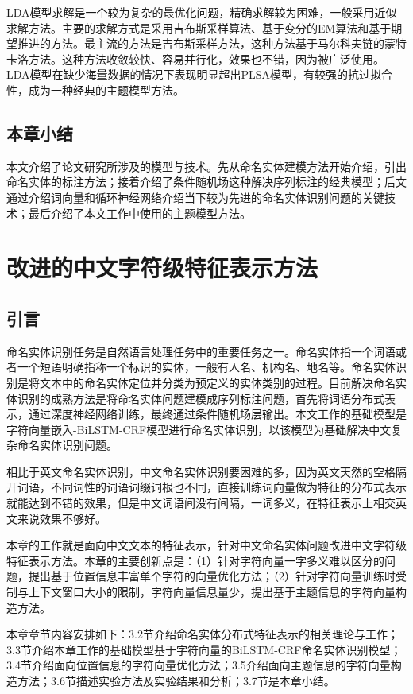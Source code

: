 \documentclass[winfonts,master,oneside,nobackinfo]{njuthesis}
\begin{document}
LDA模型求解是一个较为复杂的最优化问题，精确求解较为困难，一般采用近似求解方法。主要的求解方式是采用吉布斯采样算法、基于变分的EM算法和基于期望推进的方法。最主流的方法是吉布斯采样方法，这种方法基于马尔科夫链的蒙特卡洛方法。这种方法收敛较快、容易并行化，效果也不错，因为被广泛使用。LDA模型在缺少海量数据的情况下表现明显超出PLSA模型，有较强的抗过拟合性，成为一种经典的主题模型方法。

\section{本章小结}

本文介绍了论文研究所涉及的模型与技术。先从命名实体建模方法开始介绍，引出命名实体的标注方法；接着介绍了条件随机场这种解决序列标注的经典模型；后文通过介绍词向量和循环神经网络介绍当下较为先进的命名实体识别问题的关键技术；最后介绍了本文工作中使用的主题模型方法。


\chapter{改进的中文字符级特征表示方法}

\section{引言}

命名实体识别任务是自然语言处理任务中的重要任务之一。命名实体指一个词语或者一个短语明确指称一个标识的实体，一般有人名、机构名、地名等。命名实体识别是将文本中的命名实体定位并分类为预定义的实体类别的过程。目前解决命名实体识别的成熟方法是将命名实体问题建模成序列标注问题，首先将词语分布式表示，通过深度神经网络训练，最终通过条件随机场层输出。本文工作的基础模型是字符向量嵌入-BiLSTM-CRF模型进行命名实体识别，以该模型为基础解决中文复杂命名实体识别问题。

相比于英文命名实体识别，中文命名实体识别要困难的多，因为英文天然的空格隔开词语，不同词性的词语词缀词根也不同，直接训练词向量做为特征的分布式表示就能达到不错的效果，但是中文词语间没有间隔，一词多义，在特征表示上相交英文来说效果不够好。

本章的工作就是面向中文文本的特征表示，针对中文命名实体问题改进中文字符级特征表示方法。本章的主要创新点是：（1）针对字符向量一字多义难以区分的问题，提出基于位置信息丰富单个字符的向量优化方法；（2）针对字符向量训练时受制与上下文窗口大小的限制，字符向量信息量少，提出基于主题信息的字符向量构造方法。

本章章节内容安排如下：3.2节介绍命名实体分布式特征表示的相关理论与工作；3.3节介绍本章工作的基础模型基于字符向量的BiLSTM-CRF命名实体识别模型；3.4节介绍面向位置信息的字符向量优化方法；3.5介绍面向主题信息的字符向量构造方法；3.6节描述实验方法及实验结果和分析；3.7节是本章小结。
\end{document}
